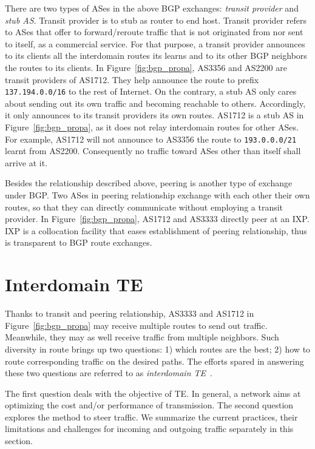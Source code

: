 There are two types of ASes in the above BGP exchanges: \textit{transit provider} and \textit{stub AS}.
Transit provider is to stub as router to end host.
Transit provider refers to ASes that offer to forward/reroute traffic that is not originated from nor sent to itself, as a commercial service.
For that purpose, a transit provider announces to its clients all the interdomain routes its learns and to its other BGP neighbors the routes to its clients.
In Figure~\ref{fig:bgp_propa}, AS3356 and AS2200 are transit providers of AS1712. They help announce the route to prefix \texttt{137.194.0.0/16}
to the rest of Internet.
On the contrary, a stub AS only cares about sending out its own traffic and becoming reachable to others.
Accordingly, it only announces to its transit providers its own routes. 
AS1712 is a stub AS in Figure~\ref{fig:bgp_propa}, as it does not relay interdomain routes for other ASes. For example, AS1712 will not announce to AS3356 the route to \texttt{193.0.0.0/21} learnt from AS2200. Consequently no traffic toward ASes other than itself shall arrive at it.

Besides the relationship described above, peering is another type of exchange under BGP. Two ASes in peering relationship exchange with each other their own routes, so that they can directly communicate without employing a transit provider.
In Figure~\ref{fig:bgp_propa}, AS1712 and AS3333 directly peer at an \ac{IXP}.
\ac{IXP} is a collocation facility that eases establishment of peering relationship, thus is transparent to BGP route exchanges.

\section{Interdomain TE}
Thanks to transit and peering relationship, AS3333 and AS1712 in Figure~\ref{fig:bgp_propa} may receive multiple routes to send out traffic.
Meanwhile, they may as well receive traffic from multiple neighbors.
Such diversity in route brings up two questions: 1) which routes are the best; 2) how to route corresponding traffic on the desired paths.
The efforts spared in answering these two questions are referred to as \textit{interdomain \ac{TE}}~\cite{Quoitin2004a,Quoitin2003,Feamster2003}.

The first question deals with the objective of \ac{TE}. In general, a network aims at optimizing the cost and/or performance of transmission.
The second question explores the method to steer traffic.
We summarize the current practices, their limitations and challenges for incoming and outgoing traffic separately in this section.


